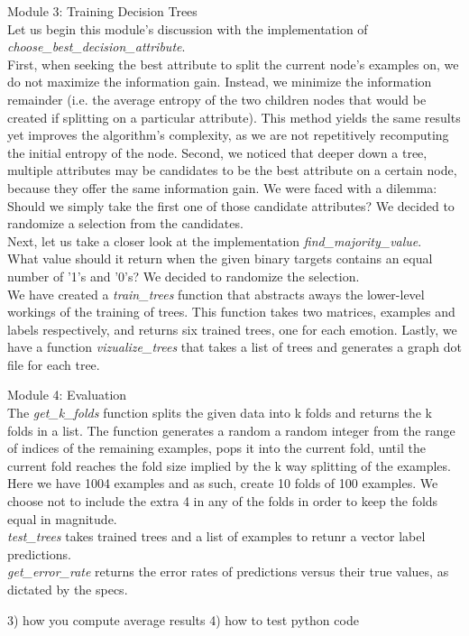 Module 3: Training Decision Trees \\
Let us begin this module's discussion with the implementation of \emph{choose\_best\_decision\_attribute}. \\
First, when seeking the best attribute to split the current node's examples on, we do not maximize the information gain.
Instead, we minimize the information remainder (i.e. the average entropy of the two children nodes
that would be created if splitting on a particular attribute).
This method yields the same results yet improves the algorithm's complexity,
as we are not repetitively recomputing the initial entropy of the node.
Second, we noticed that deeper down a tree, multiple attributes may be candidates to be the best attribute on a certain node,
because they offer the same information gain. We were faced with a dilemma: Should we simply
take the first one of those candidate attributes? We decided to randomize a selection from the candidates.\\
Next, let us take a closer look at the implementation \emph{find\_majority\_value}.\\
What value should it return when the given binary targets contains an equal number of
'1's and '0's? We decided to randomize the selection.\\
We have created a \emph{train\_trees} function that abstracts aways the lower-level workings of the training
of trees. This function takes two matrices, examples and labels respectively,
and returns six trained trees, one for each emotion.
Lastly, we have a function \emph{vizualize\_trees} that takes a list of trees and generates a graph dot file
for each tree.

Module 4: Evaluation \\
The \emph{get\_k\_folds} function splits the given data into k folds and returns the k folds in a list.
The function generates a random a random integer from the range of indices
of the remaining examples, pops it into the current fold, until the current fold reaches the fold size implied
by the k way splitting of the examples. Here we have 1004 examples and as such, create 10 folds of 100 examples.
We choose not to include the extra 4 in any of the folds in order to keep the folds equal in magnitude.\\
\emph{test\_trees} takes trained trees and a list of examples to retunr a vector label predictions.\\
\emph{get\_error\_rate} returns the error rates of predictions versus their true values, as dictated by the specs.





3) how you compute average results
4) how to test python code
